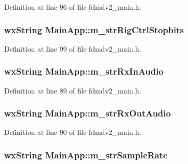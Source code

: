 Definition at line 96 of file fdmdv2\-\_\-main.\-h.

\hypertarget{class_main_app_ab9b597849713a2a3a18782243c2cbf89}{
\subsubsection[{m\-\_\-str\-Rig\-Ctrl\-Stopbits}]{\setlength{\rightskip}{0pt plus 5cm}wx\-String Main\-App\-::m\-\_\-str\-Rig\-Ctrl\-Stopbits}}\label{class_main_app_ab9b597849713a2a3a18782243c2cbf89}


Definition at line 99 of file fdmdv2\-\_\-main.\-h.

\hypertarget{class_main_app_a131c5ad5d714c9ed32a79467e788ac18}{
\subsubsection[{m\-\_\-str\-Rx\-In\-Audio}]{\setlength{\rightskip}{0pt plus 5cm}wx\-String Main\-App\-::m\-\_\-str\-Rx\-In\-Audio}}\label{class_main_app_a131c5ad5d714c9ed32a79467e788ac18}


Definition at line 89 of file fdmdv2\-\_\-main.\-h.

\hypertarget{class_main_app_a73d4ee823e86cc78439be9f50ce4eca1}{
\subsubsection[{m\-\_\-str\-Rx\-Out\-Audio}]{\setlength{\rightskip}{0pt plus 5cm}wx\-String Main\-App\-::m\-\_\-str\-Rx\-Out\-Audio}}\label{class_main_app_a73d4ee823e86cc78439be9f50ce4eca1}


Definition at line 90 of file fdmdv2\-\_\-main.\-h.

\hypertarget{class_main_app_acd7dcb55a60f5b3a343238fdd60b748f}{
\subsubsection[{m\-\_\-str\-Sample\-Rate}]{\setlength{\rightskip}{0pt plus 5cm}wx\-String Main\-App\-::m\-\_\-str\-Sample\-Rate}}\label{class_main_app_acd7dcb55a60f5b3a343238fdd60b748f}


